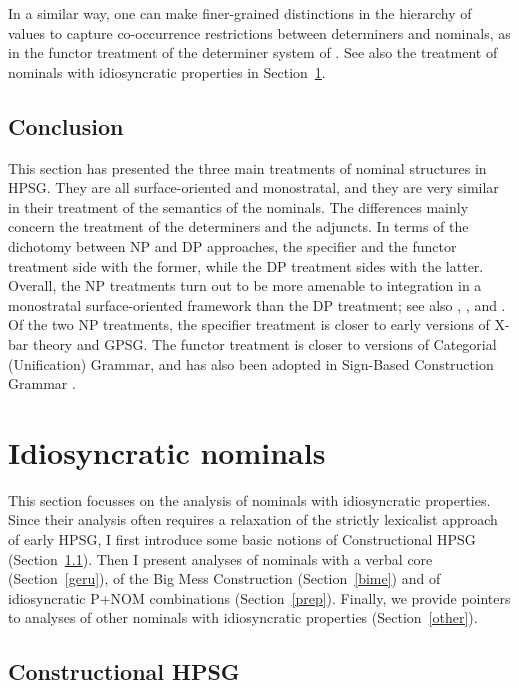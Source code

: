 \documentclass[output=paper,biblatex,babelshorthands,newtxmath,draftmode,colorlinks,citecolor=brown]{langscibook}
\begin{document}
In a similar way, one can make finer-grained distinctions in the hierarchy of  
 values to capture co-occurrence restrictions between determiners and 
nominals, as in the functor treatment of the  determiner system of 
\citet{Allegranza06}. See also the treatment of nominals with idiosyncratic properties 
in Section~\ref{idio}. 


\subsection{Conclusion} 


This section has presented the three main treatments of nominal structures in HPSG. 
They are all surface-oriented and monostratal, and they are very similar in their 
treatment of the semantics of the nominals. 
The differences mainly concern the treatment of the determiners and the adjuncts. 
In terms of the dichotomy between NP and DP approaches, the specifier and the functor 
treatment side with the former, while the DP treatment sides with the latter. 
Overall, the NP treatments turn out to be more amenable to integration  
in a monostratal surface-oriented framework than the DP treatment; see also 
, , and . Of the two NP treatments,
the specifier treatment is closer to early versions of X-bar theory and GPSG.   
The functor treatment is closer to versions of Categorial (Unification) Grammar, and 
has also been adopted in Sign-Based Construction Grammar \citep[155--157]{Sag2012}.

 

\section{Idiosyncratic nominals}
\label{idio}

\largerpage
This section focusses on the analysis of nominals with idiosyncratic properties. 
Since their analysis often requires a relaxation of the strictly lexicalist approach 
of early HPSG, I first introduce some basic notions of Constructional HPSG (Section~\ref{cohp}). 
Then I present analyses of nominals with a verbal core (Section~\ref{geru}), 
of the Big Mess Construction (Section~\ref{bime}) and of idiosyncratic P+NOM combinations 
(Section~\ref{prep}). Finally, we provide pointers to analyses of other nominals with 
idiosyncratic properties (Section~\ref{other}). 


\subsection{Constructional HPSG} 
\label{cohp}
\end{document}
